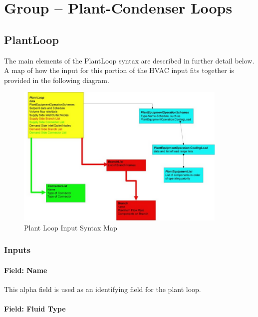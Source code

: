 \section{Group -- Plant-Condenser Loops}\label{group-plant-condenser-loops}

\subsection{PlantLoop}\label{plantloop}

The main elements of the PlantLoop syntax are described in further detail below. A map of how the input for this portion of the HVAC input fits together is provided in the following diagram.

\begin{figure}[hbtp] %
\centering
\includegraphics[width=0.9\textwidth, height=0.9\textheight, keepaspectratio=true]{media/image135.png}
\caption{Plant Loop Input Syntax Map \protect \label{fig:plant-loop-input-syntax-map}}
\end{figure}

\subsubsection{Inputs}\label{inputs-035}

\paragraph{Field: Name}\label{field-name-034}

This alpha field is used as an identifying field for the plant loop.

\paragraph{Field: Fluid Type}\label{field-fluid-type-001}

